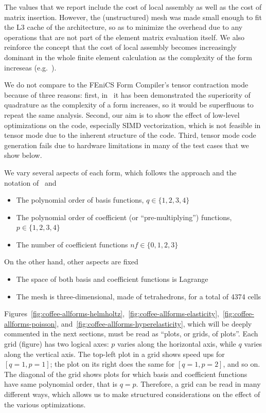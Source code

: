 
The values that we report include the cost of local assembly as well as the cost of matrix insertion. However, the (unstructured) mesh was made small enough to fit the L3 cache of the architecture, so as to minimize the overhead due to any operations that are not part of the element matrix evaluation itself. We also reinforce the concept that the cost of local assembly becomes increasingly dominant in the whole finite element calculation as the complexity of the form increseas (e.g.~\citep{quadrature-olegaard}). 

We do not compare to the FEniCS Form Compiler's tensor contraction mode~\citep{tensor-kirby} because of three reasons: first, in~\citep{quadrature-olegaard} it has been demonstrated the superiority of quadrature as the complexity of a form increases, so it would be superfluous to repeat the same analysis. Second, our aim is to show the effect of low-level optimizations on the code, especially SIMD vectorization, which is not feasible in tensor mode due to the inherent structure of the code. Third, tensor mode code generation fails due to hardware limitations in many of the test cases that we show below.

We vary several aspects of each form, which follows the approach and the notation of~\citep{quadrature-olegaard} and~\citep{francis}
\begin{itemize}
\item The polynomial order of basis functions, $q \in \lbrace1, 2, 3, 4\rbrace$
\item The polynomial order of coefficient (or ``pre-multiplying'') functions, $p \in \lbrace1, 2, 3, 4\rbrace$
\item The number of coefficient functions $nf \in \lbrace0, 1, 2, 3\rbrace$
\end{itemize}
On the other hand, other aspects are fixed 
\begin{itemize}
\item The space of both basis and coefficient functions is Lagrange
\item The mesh is three-dimensional, made of tetrahedrons, for a total of 4374 cells
\end{itemize}

Figures~\ref{fig:coffee-allforms-helmholtz},~\ref{fig:coffee-allforms-elasticity},~\ref{fig:coffee-allforms-poisson}, and~\ref{fig:coffee-allforms-hyperelasticity}, which will be deeply commented in the next sections, must be read as ``plots, or grids, of plots''. Each grid (figure) has two logical axes: $p$ varies along the horizontal axis, while $q$ varies along the vertical axis. The top-left plot in a grid shows speed ups for $[q=1, p=1]$; the plot on its right does the same for $[q=1, p=2]$, and so on. The diagonal of the grid shows plots for which basis and coefficient functions have same polynomial order, that is $q=p$. Therefore, a grid can be read in many different ways, which allows us to make structured considerations on the effect of the various optimizations. 

